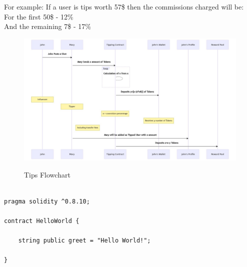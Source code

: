 \documentclass[10pt]{article}
\begin{document}
For example: If a user is tips worth 57\$ then the commissions charged will be:\\

For the first     50\$ - 12\%\\
And the remaining 7\$  - 17\%\\
\begin{figure}[H]
\includegraphics[width=\textwidth]{tips}\\
\caption{Tips Flowchart}
\end{figure}

\begin{lstlisting}[language=Solidity, caption={Tipping Solidity Snippet}]

pragma solidity ^0.8.10;

contract HelloWorld {

    string public greet = "Hello World!";
    
}

\end{lstlisting}
\end{document}
